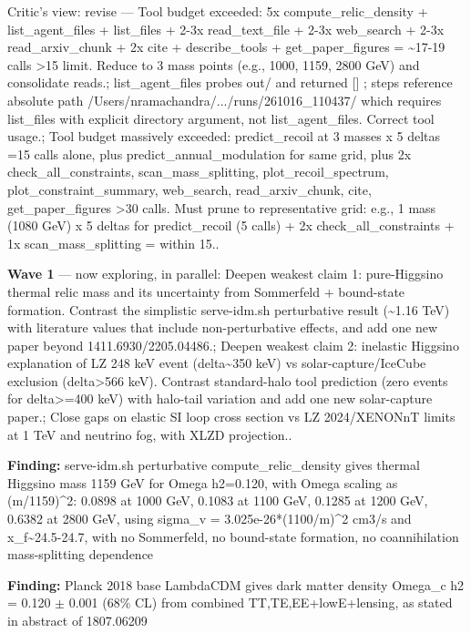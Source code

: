 \documentclass[11pt,a4paper]{article}
\begin{document}
\begin{enumerate}
Critic's view: revise --- Tool budget exceeded: 5x compute\_relic\_density + list\_agent\_files + list\_files + 2-3x read\_text\_file + 2-3x web\_search + 2-3x read\_arxiv\_chunk + 2x cite + describe\_tools + get\_paper\_figures = \textasciitilde{}17-19 calls \textgreater{}15 limit. Reduce to 3 mass points (e.g., 1000, 1159, 2800 GeV) and consolidate reads.; list\_agent\_files probes out/ and returned [] ; steps reference absolute path /Users/nramachandra/.../runs/261016\_110437/ which requires list\_files with explicit directory argument, not list\_agent\_files. Correct tool usage.; Tool budget massively exceeded: predict\_recoil at 3 masses x 5 deltas =15 calls alone, plus predict\_annual\_modulation for same grid, plus 2x check\_all\_constraints, scan\_mass\_splitting, plot\_recoil\_spectrum, plot\_constraint\_summary, web\_search, read\_arxiv\_chunk, cite, get\_paper\_figures \textgreater{}30 calls. Must prune to representative grid: e.g., 1 mass (1080 GeV) x 5 deltas for predict\_recoil (5 calls) + 2x check\_all\_constraints + 1x scan\_mass\_splitting = within 15..

\end{enumerate}
\textbf{Wave 1} --- now exploring, in parallel: Deepen weakest claim 1: pure-Higgsino thermal relic mass and its uncertainty from Sommerfeld + bound-state formation. Contrast the simplistic serve-idm.sh perturbative result (\textasciitilde{}1.16 TeV) with literature values that include non-perturbative effects, and add one new paper beyond 1411.6930/2205.04486.; Deepen weakest claim 2: inelastic Higgsino explanation of LZ 248 keV event (delta\textasciitilde{}350 keV) vs solar-capture/IceCube exclusion (delta\textgreater{}566 keV). Contrast standard-halo tool prediction (zero events for delta\textgreater{}=400 keV) with halo-tail variation and add one new solar-capture paper.; Close gaps on elastic SI loop cross section vs LZ 2024/XENONnT limits at 1 TeV and neutrino fog, with XLZD projection..

\textbf{Finding:} serve-idm.sh perturbative compute\_relic\_density gives thermal Higgsino mass 1159 GeV for Omega h2=0.120, with Omega scaling as (m/1159)\textasciicircum{}2: 0.0898 at 1000 GeV, 0.1083 at 1100 GeV, 0.1285 at 1200 GeV, 0.6382 at 2800 GeV, using sigma\_v = 3.025e-26*(1100/m)\textasciicircum{}2 cm3/s and x\_f\textasciitilde{}24.5-24.7, with no Sommerfeld, no bound-state formation, no coannihilation mass-splitting dependence

\textbf{Finding:} Planck 2018 base LambdaCDM gives dark matter density Omega\_c h2 = 0.120 $\pm$ 0.001 (68\% CL) from combined TT,TE,EE+lowE+lensing, as stated in abstract of 1807.06209
\end{document}
